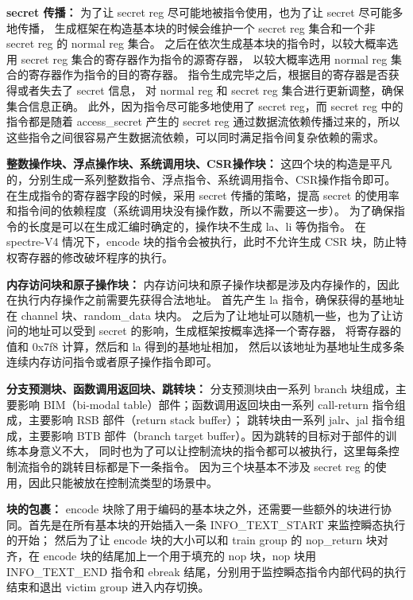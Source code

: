 \textbf{secret 传播：}
为了让 secret reg 尽可能地被指令使用，也为了让 secret 尽可能多地传播，
生成框架在构造基本块的时候会维护一个 secret reg 集合和一个非 secret reg 的 normal reg 集合。
之后在依次生成基本块的指令时，以较大概率选用 secret reg 集合的寄存器作为指令的源寄存器，
以较大概率选用 normal reg 集合的寄存器作为指令的目的寄存器。
指令生成完毕之后，根据目的寄存器是否获得或者失去了 secret 信息，
对 normal reg 和 secret reg 集合进行更新调整，确保集合信息正确。
此外，因为指令尽可能多地使用了 secret reg，而 secret reg 中的指令都是随着 access\_secret 产生的 secret reg
通过数据流依赖传播过来的，所以这些指令之间很容易产生数据流依赖，可以同时满足指令间复杂依赖的需求。\par

\textbf{整数操作块、浮点操作块、系统调用块、CSR操作块：}
这四个块的构造是平凡的，分别生成一系列整数指令、浮点指令、系统调用指令、CSR操作指令即可。
在生成指令的寄存器字段的时候，采用 secret 传播的策略，提高 secret 的使用率和指令间的依赖程度（系统调用块没有操作数，所以不需要这一步）。
为了确保指令的长度是可以在生成汇编时确定的，操作块不生成 la、li 等伪指令。
在 spectre-V4 情况下，encode 块的指令会被执行，此时不允许生成 CSR 块，防止特权寄存器的修改破坏程序的执行。\par

\textbf{内存访问块和原子操作块：}
内存访问块和原子操作块都是涉及内存操作的，因此在执行内存操作之前需要先获得合法地址。
首先产生 la 指令，确保获得的基地址在 channel 块、random\_data 块内。
之后为了让地址可以随机一些，也为了让访问的地址可以受到 secret 的影响，生成框架按概率选择一个寄存器，
将寄存器的值和 0x7f8 计算，然后和 la 得到的基地址相加，
然后以该地址为基地址生成多条连续内存访问指令或者原子操作指令即可。\par

\textbf{分支预测块、函数调用返回块、跳转块：}
分支预测块由一系列 branch 块组成，主要影响 BIM（bi-modal table）部件；函数调用返回块由一系列 call-return 指令组成，主要影响 RSB 部件（return stack buffer）；
跳转块由一系列 jalr、jal 指令组成，主要影响 BTB 部件（branch target buffer）。因为跳转的目标对于部件的训练本身意义不大，
同时也为了可以让控制流块的指令都可以被执行，这里每条控制流指令的跳转目标都是下一条指令。
因为三个块基本不涉及 secret reg 的使用，因此只能被放在控制流类型的场景中。\par

\textbf{块的包裹：}
encode 块除了用于编码的基本块之外，还需要一些额外的块进行协同。首先是在所有基本块的开始插入一条 INFO\_TEXT\_START 来监控瞬态执行的开始；
然后为了让 encode 块的大小可以和 train group 的 nop\_return 块对齐，在 encode 块的结尾加上一个用于填充的 nop 块，nop 块用 INFO\_TEXT\_END 指令和
ebreak 结尾，分别用于监控瞬态指令内部代码的执行结束和退出 victim group 进入内存切换。\par

